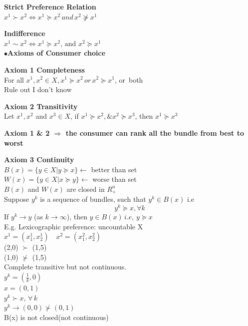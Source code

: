 \documentclass[letterpaper,13pt,single,pdftex]{scrartcl}
\begin{document}
\par \textbf{Strict Preference Relation}\\
 $x^1 \succ x^2  \Leftrightarrow  x^1 \succeq x^2\, and\, x^2 \not\succeq x^1$

\par \textbf{Indifference}\\
 $x^1 \sim x^2 \Leftrightarrow x^1 \succeq x^2 \text{, and } x^2 \succeq x^1$\\

$\bullet$\textbf{Axioms of Consumer choice}

    \textbf{Axiom 1 Completeness}\\
 For all $x^1, x^2 \in X, x^1 \succeq x^2 \,or \,x^2 \succeq x^1$, or \,both\\
Rule out I don't know

 \textbf{Axiom 2 Transitivity}
 \\ Let $x^1 ,x^2$ and $x^3 \in X$, if $x^1 \succeq x^2, \& x^2 \succeq x^3$, then $x^1 \succeq x^3$




\textbf{Axiom 1 \& 2 $\Rightarrow$ the consumer can rank all the bundle from best to worst}\\


 \textbf{Axiom 3 Continuity}
 \\$ B(x) =  \{y\in X | y \succeq x\}  \leftarrow $ better than set\\
 $W(x) = \{y\in X|x \succeq y\} \leftarrow$ worse than set\\
 $B(x)$ and $W(x)$ are closed in $R^n_+$
\\Suppose $y^k$ is a sequence of bundles, such that $y^k\in B(x)$ i.e
\[y^k \succeq x, \forall k\]
If $y^k \rightarrow y$ (as $k\rightarrow\infty$), then $ y\in B(x) \,i.e, \,y\succeq x$\\

E.g. Lexicographic preference: uncountable X\\
$x^1 = (x_1^1, x_2^1) \quad x^2 = (x_1^2, x_2^2)$\\
(2,0) $\succ$ (1,5)\\
(1,0) $\nsucc$ (1,5)\\
Complete transitive but not continuous. \\
$y^k=(\frac{1}{k},0)$\\
$x=(0,1)$\\
$y^k \succ x,\,\forall \,k$\\
$y^k \rightarrow (0,0) \nsucc (0,1)$\\
B(x) is not closed(not continuous)\\
\end{document}
